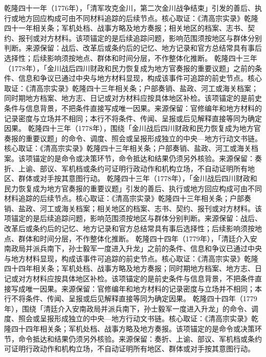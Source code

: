 乾隆四十一年（1776年），「清军攻克金川，第二次金川战争结束」引发的善后、执行或地方回应构成可由不同材料追踪的后续节点。核心取证：《清高宗实录》乾隆四十一年相关条；军机处档、战事方略及地方奏报；相关地区的档案、志书、契约、报刊或对方材料。该项锚定的是后续追踪问题，影响范围须按地区与群体分别判断。来源保留：战后、改革后或条约后的记忆、地方记录和官方总结常具有事后选择性；后续影响须按地点、群体和时间分层，不作整体化推断。
乾隆四十三年（1778年），「金川战后四川财政和民力恢复成为地方官奏报的重要议题」之前的条件、信息和争议已通过中央与地方材料显现，构成该事件可追踪的前史节点。核心取证：《清高宗实录》乾隆四十三年相关条；户部奏销、盐政、河工或海关档案；同时期地方档案、地方志、日记或对方材料应按具体地区补检。该项锚定的是前史条件与信息背景，不把条件直接写成唯一因果。来源保留：官修编年和地方材料的记录密度与立场并不相同；本行不将条件、传闻、呈报或后见解释直接等同为确定因果。
乾隆四十三年（1778年），围绕「金川战后四川财政和民力恢复成为地方官奏报的重要议题」的命令、调度、照会或呈报形成独立的中央—地方行动文书链。核心取证：《清高宗实录》乾隆四十三年相关条；户部奏销、盐政、河工或海关档案。该项锚定的是命令或决策环节，命令抵达和结果仍须另外核验。来源保留：奏折、上谕、部议、军机档或条约可证明行政动作和机构立场，不自动证明所有地区、群体或对手按其意图行动。
乾隆四十三年（1778年），「金川战后四川财政和民力恢复成为地方官奏报的重要议题」引发的善后、执行或地方回应构成可由不同材料追踪的后续节点。核心取证：《清高宗实录》乾隆四十三年相关条；户部奏销、盐政、河工或海关档案；相关地区的档案、志书、契约、报刊或对方材料。该项锚定的是后续追踪问题，影响范围须按地区与群体分别判断。来源保留：战后、改革后或条约后的记忆、地方记录和官方总结常具有事后选择性；后续影响须按地点、群体和时间分层，不作整体化推断。
乾隆四十四年（1779年），「清廷介入安南政局并派兵南下，孙士毅军一度进入升龙」之前的条件、信息和争议已通过中央与地方材料显现，构成该事件可追踪的前史节点。核心取证：《清高宗实录》乾隆四十四年相关条；军机处档、战事方略及地方奏报；同时期地方档案、地方志、日记或对方材料应按具体地区补检。该项锚定的是前史条件与信息背景，不把条件直接写成唯一因果。来源保留：官修编年和地方材料的记录密度与立场并不相同；本行不将条件、传闻、呈报或后见解释直接等同为确定因果。
乾隆四十四年（1779年），围绕「清廷介入安南政局并派兵南下，孙士毅军一度进入升龙」的命令、调度、照会或呈报形成独立的中央—地方行动文书链。核心取证：《清高宗实录》乾隆四十四年相关条；军机处档、战事方略及地方奏报。该项锚定的是命令或决策环节，命令抵达和结果仍须另外核验。来源保留：奏折、上谕、部议、军机档或条约可证明行政动作和机构立场，不自动证明所有地区、群体或对手按其意图行动。
